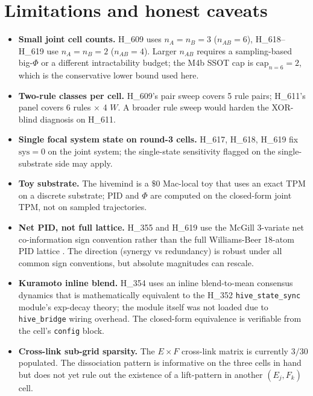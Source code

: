 \documentclass[11pt,a4paper]{article}
\begin{document}
\section{Limitations and honest caveats}
\label{sec:limits}

\begin{itemize}\itemsep0.2em
\item \textbf{Small joint cell counts.} H\_609 uses $n_A=n_B=3$
      ($n_{AB}=6$), H\_618--H\_619 use $n_A=n_B=2$ ($n_{AB}=4$).
      Larger $n_{AB}$ requires a sampling-based big-$\Phi$
      \citep{albantakis2023iit4} or a different intractability
      budget; the M4b SSOT cap is $\mathrm{cap}_{n=6}=2$, which is
      the conservative lower bound used here.
\item \textbf{Two-rule classes per cell.} H\_609's pair sweep covers
      5 rule pairs; H\_611's panel covers 6 rules $\times$ 4 $W$. A
      broader rule sweep would harden the XOR-blind diagnosis on
      H\_611.
\item \textbf{Single focal system state on round-3 cells.} H\_617,
      H\_618, H\_619 fix $\mathrm{sys}=0$ on the joint system; the
      single-state sensitivity flagged on the single-substrate side
      \citep{anima_H348} may apply.
\item \textbf{Toy substrate.} The hivemind is a $\$0$ Mac-local toy
      that uses an exact TPM on a discrete substrate; PID and
      $\Phi$ are computed on the closed-form joint TPM, not on
      sampled trajectories.
\item \textbf{Net PID, not full lattice.} H\_355 and H\_619 use the
      McGill 3-variate net co-information sign convention rather
      than the full Williams-Beer 18-atom PID lattice
      \citep{williams2010pid,bertschinger2014synergistic}. The
      direction (synergy vs redundancy) is robust under all common
      sign conventions, but absolute magnitudes can rescale.
\item \textbf{Kuramoto inline blend.} H\_354 uses an inline
      blend-to-mean consensus dynamics that is mathematically
      equivalent to the H\_352 \texttt{hive\_state\_sync} module's
      exp-decay theory; the module itself was not loaded due to
      \texttt{hive\_bridge} wiring overhead. The closed-form
      equivalence is verifiable from the cell's
      \texttt{config} block.
\item \textbf{Cross-link sub-grid sparsity.} The $E \times F$
      cross-link matrix is currently $3/30$ populated. The
      dissociation pattern is informative on the three cells in
      hand but does not yet rule out the existence of a
      lift-pattern in another $(E_j, F_k)$ cell.
\end{itemize}
\end{document}
